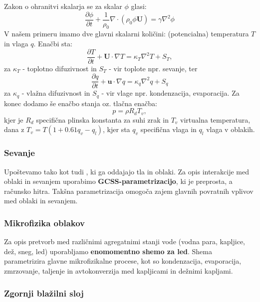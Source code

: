 \documentclass[mat2, tisk]{fmfdelo}
\begin{document}
Zakon o ohranitvi skalarja se za skalar $\phi$ glasi:
\begin{equation}
\frac{\partial \phi}{\partial t} + \frac{1}{\rho_0}\nabla \cdot (\rho_0 \phi\textbf{U}) = \gamma \nabla^2 \phi
\end{equation}
V našem primeru imamo dve glavni skalarni količini: (potencialna) 
temperatura $T$ in vlaga $q$. Enačbi sta: 
\begin{equation}
  \frac{\partial T}{\partial t} + \mathbf{U}\cdot\nabla T
   = \kappa_T \nabla^2 T + S_T, 
\end{equation}
za $\kappa_T$ - toplotno difuzivnost in $S_T$ - vir toplote npr. sevanje, 
ter 
\begin{equation}
  \frac{\partial q}{\partial t} + \mathbf{u}\cdot\nabla q
   = \kappa_q \nabla^2 q + S_q
\end{equation}
za $\kappa_q$ - vlažna difuzivnost in $S_q$ - vir vlage npr. kondenzacija, evaporacija.
Za konec dodamo še enačbo stanja oz. tlačna enačba:
\begin{equation}
    p = \rho R_d T_v,
\end{equation}
kjer je $R_d$ specifična plinska konstanta za suhi zrak in $T_v$ virtualna temperatura, dana
z $T_v = T \left( 1 + 0.61 q_v - q_l \right)$, kjer sta $q_v$ specifična vlaga in 
$q_l$ vlaga v oblakih.

\subsubsection{Sevanje}

Upoštevamo tako  kot tudi , ki ga oddajajo tla in oblaki. 
Za opis interakcije med oblaki in sevanjem uporabimo \textbf{GCSS-parametrizacijo}, ki je preprosta, a računsko hitra. 
Takšna parametrizacija omogoča zajem glavnih povratnih vplivov med oblaki in sevanjem.

\subsubsection{Mikrofizika oblakov}

Za opis pretvorb med različnimi agregatnimi stanji vode 
(vodna para, kapljice, dež, sneg, led) uporabljamo 
\textbf{enomomentno shemo za led}. Shema parametrizira glavne 
mikrofizikalne procese, kot so kondenzacija, evaporacija, zmrzovanje, 
taljenje in avtokonverzija med kapljicami in dežnimi kapljami.

\subsubsection{Zgornji blažilni sloj}
\end{document}
